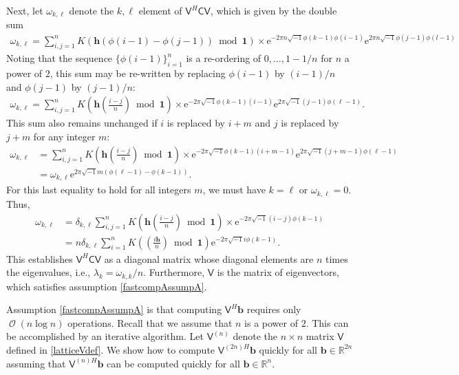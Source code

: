 \documentclass{iitthesis}          %
\DeclareMathOperator{\Order}{{\mathcal O}}
\newcommand{\bm}[1]{\boldsymbol{#1}}
\newcommand{\reals}{\mathbb{R}}
\newcommand{\vb}{\bm{b}}
\newcommand{\vh}{\bm{h}}
\newcommand{\vone}{\bm{1}}
\newcommand{\mC}{\mathsf{C}}
\newcommand{\mV}{\mathsf{V}}
\newcommand{\me}{\mathrm{e}}
\begin{document}
Next, let $\omega_{k, \ell}$ denote the $k,\ell$ element of $\mV^H \mC \mV$, which is given by the double sum
\begin{align*}
\omega_{k, \ell} = \sum_{i,j=1}^n K(\vh(\phi(i-1) - \phi(j-1)) \bmod \vone ) 
\times   \me^{-2 \pi n \sqrt{-1} \phi(k-1)\phi(i-1)}  \me^{2 \pi n \sqrt{-1} \phi(j-1)\phi(l-1)}
\end{align*}
Noting that the sequence $\{\phi(i-1)\}_{i=1}^n$ is a re-ordering of $0, \ldots, 1-1/n$ for $n$ a power of $2$, this sum may be re-written by replacing $\phi(i-1)$ by $(i-1)/n$ and $\phi(j-1)$ by $(j-1)/n$:
\begin{align*}
\omega_{k, \ell} = \sum_{i,j=1}^n K\left (\vh \left(\frac{i-j}{n} \right) \bmod \vone \right) 
\times   \me^{-2 \pi \sqrt{-1} \phi(k-1)(i-1)}  \me^{2 \pi \sqrt{-1} (j-1)\phi(\ell-1)}.
\end{align*}
This sum also remains unchanged if $i$ is replaced by $i+m$ and $j$ is replaced by $j+m$ for any integer $m$:
\begin{align*}
\omega_{k, \ell} &= \sum_{i,j=1}^n K\left (\vh \left(\frac{i-j}{n} \right) \bmod \vone \right) 
\times   \me^{-2 \pi \sqrt{-1} \phi(k-1)(i+m-1)}  \me^{2 \pi \sqrt{-1} (j+m-1)\phi(\ell-1)} \\
 &=   \omega_{k, \ell}  \me^{2 \pi \sqrt{-1} m(\phi(\ell-1) - \phi(k-1))}.
\end{align*}
For this last equality to hold for all integers $m$, we must have $k = \ell$ or $\omega_{k,\ell} = 0$.  Thus, 
\begin{align*}
\omega_{k, \ell} &= \delta_{k,\ell} \sum_{i,j=1}^n K\left (\vh \left(\frac{i-j}{n} \right) \bmod \vone \right) \times   \me^{-2 \pi \sqrt{-1} (i - j) \phi(k-1)} \\
& = n \delta_{k,\ell}  \sum_{i=1}^n K\left ( \left(\frac{i\vh}{n} \right) \bmod \vone \right)  \me^{-2 \pi \sqrt{-1} i \phi(k-1) }.
\end{align*}
This establishes $\mV^H \mC \mV$ as a diagonal matrix whose diagonal elements are $n$ times the eigenvalues, i.e., $\lambda_k = \omega_{k,k}/n$.  Furthermore, $\mV$ is the matrix of eigenvectors, which satisfies assumption \eqref{fastcompAssumpA}.

\label{sec:iter_fft}
Assumption \eqref{fastcompAssumpA} is that computing $\mV^H \vb$ requires only $\Order(n \log n) $ operations.  Recall that we assume that $n$ is a power of $2$.  This can be accomplished by an iterative algorithm.  Let $\mV^{(n)}$ denote the $n \times n$ matrix $\mV$ defined in  \eqref{latticeVdef}.  We show how to compute $\mV^{(2n)H}\vb$ quickly for all $\vb \in \reals^{2n}$ assuming that $\mV^{(n)H}\vb$ can be computed quickly for all $\vb \in \reals^n$.
\end{document}
